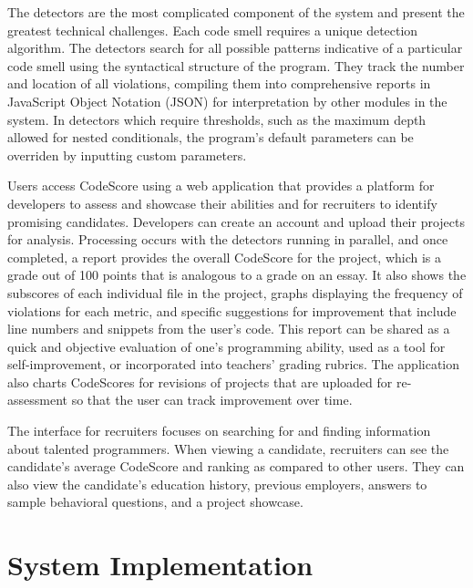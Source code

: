 \documentclass{sig-alternate}
\begin{document}
The detectors are the most complicated component of the system and present the
greatest technical challenges. Each code smell requires a unique detection
algorithm. The detectors search for all possible patterns indicative of a
particular code smell using the syntactical structure of the program. They track the number and location of all 
violations, compiling them into comprehensive reports in JavaScript Object Notation (JSON) for interpretation by
other modules in the system. In detectors which require thresholds, 
such as the maximum depth allowed for nested conditionals, the program's default
parameters can be overriden by inputting custom parameters.

Users access CodeScore using a web application that provides a platform for
developers to assess and showcase their abilities and for recruiters to identify
promising candidates. Developers can create an account
and upload their projects for analysis. Processing occurs with the detectors
running in parallel, and once completed, a report
provides the overall CodeScore for the project, which is a grade out of 100
points that is analogous to a grade on an essay. It also shows the subscores of each
individual file in the project, graphs displaying the frequency of violations
for each metric, and specific suggestions for improvement that include line
numbers and snippets from the user's code. This report can be shared as a quick and objective
evaluation of one's programming ability, used as a tool for
self-improvement, or incorporated into teachers' grading rubrics. The
application also charts CodeScores for revisions
of projects that are uploaded for re-assessment so that the user can track
improvement over time.

The interface for recruiters focuses on searching for and finding information
about talented programmers. When viewing a candidate, recruiters can see the candidate's average
CodeScore and ranking as compared to other users. They can also view the
candidate's education history, previous employers, answers to sample behavioral
questions, and a project showcase. 

\section{System Implementation}
\label{subsec:approach}
\end{document}
